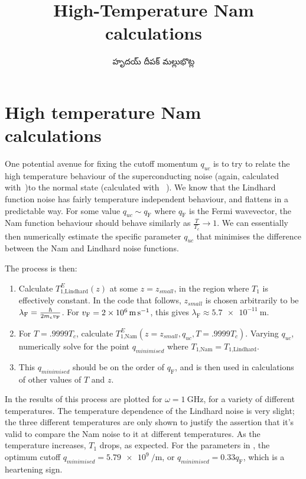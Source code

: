\documentclass[../main.tex]{subfiles}
\title{High-Temperature Nam calculations}
\author{\begin{telugu}హృదయ్ దీపక్ మల్లుభొట్ల\end{telugu}}
\date{}
\begin{document}
	\onlyinsubfile{\maketitle}

	\section{High temperature Nam calculations} \label{sec:htn:intro}

	One potential avenue for fixing the cutoff momentum $q_{uc}$ is to try to relate the high temperature behaviour of the superconducting noise (again, calculated with~\cite{Nam1967})to the normal state (calculated with ~\cite{SolyomV3}).
	We know that the Lindhard function noise has fairly temperature independent behaviour, and flattens in a predictable way.
	For some value $q_{uc} \sim q_{\textrm{F}}$ where $q_{\textrm{F}}$ is the Fermi wavevector, the Nam function behaviour should behave similarly as $\frac{T}{T_c} \rightarrow 1$.
	We can essentially then numerically estimate the specific parameter $q_{uc}$ that minimises the difference between the Nam and Lindhard noise functions.

	The process is then:
	\begin{enumerate}
		\item Calculate $T_{1\textrm{,Lindhard}}^{E}(z)$ at some $z = z_{small}$, in the region where $T_1$ is effectively constant.
			In the code that follows, $z_{small}$ is chosen arbitrarily to be $\lambda_{\textrm{F}} = \frac{\hbar}{2 m_e v_{\mathrm{F}}}$.
			For $\vf = \SI{2e6}{\m\per\s}$, this gives $\lambda_{\textrm{F}} \approx \SI{5.7e-11}{\m}$.
		\item For $T = .9999 T_c$, calculate $T_{1\textrm{,Nam}}^{E}(z = z_{small}, q_{uc}, T=.9999 T_c)$.
			Varying $q_{uc}$, numerically solve for the point $q_{minimised}$ where $T_{1\textrm{,Nam}} = T_{1\textrm{,Lindhard}}$.
		\item This $q_{minimised}$ should be on the order of $q_{\textrm{F}}$, and is then used in calculations of other values of $T$ and $z$.
	\end{enumerate}

	In  the results of this process are plotted for $\omega=\SI{1}{\giga\Hz}$, for a variety of different temperatures.
	The temperature dependence of the Lindhard noise is very slight;
	the three different temperatures are only shown to justify the assertion that it's valid to compare the Nam noise to it at different temperatures.
	As the temperature increases, $T_1$ drops, as expected.
	For the parameters in , the optimum cutoff $q_{minimised} = \SI{5.79e9}{\per\meter}$, or $q_{minimised}=0.33 q_{\textrm{F}}$, which is a heartening sign.
\end{document}
